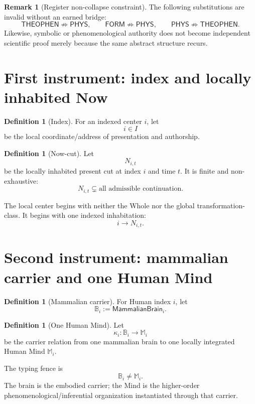 \documentclass[10pt]{article}
\theoremstyle{pe}
\theoremstyle{definition}
\newtheorem{definition}[theorem]{Definition}
\newtheorem{remark}[theorem]{Remark}
\newcommand{\Brain}{\mathsf{MammalianBrain}}
\newcommand{\THEOPHEN}{\mathsf{THEOPHEN}}
\newcommand{\FORM}{\mathsf{FORM}}
\newcommand{\PHYS}{\mathsf{PHYS}}
\begin{document}
\begin{remark}[Register non-collapse constraint]
The following substitutions are invalid without an earned bridge:
\[
\THEOPHEN\not\Rightarrow\PHYS,
\qquad
\FORM\not\Rightarrow\PHYS,
\qquad
\PHYS\not\Rightarrow\THEOPHEN.
\]
Likewise, symbolic or phenomenological authority does not become independent scientific proof merely because the same abstract structure recurs.
\end{remark}

\section{First instrument: index and locally inhabited Now}

\begin{definition}[Index]
For an indexed center \(i\), let
\[
  i\in I
\]
be the local coordinate/address of presentation and authorship.
\end{definition}

\begin{definition}[Now-cut]
Let
\[
  N_{i,t}
\]
be the locally inhabited present cut at index \(i\) and time \(t\).  It is finite and non-exhaustive:
\[
  N_{i,t}\subsetneq \text{all admissible continuation}.
\]
\end{definition}

The local center begins with neither the Whole nor the global transformation-class.  It begins with one indexed inhabitation:
\[
  i\longrightarrow N_{i,t}.
\]

\section{Second instrument: mammalian carrier and one Human Mind}

\begin{definition}[Mammalian carrier]
For Human index \(i\), let
\[
  \mathbb B_i:=\Brain_i.
\]
\end{definition}

\begin{definition}[One Human Mind]
Let
\[
  \kappa_i:\mathbb B_i\longrightarrow \mathbb M_i
\]
be the carrier relation from one mammalian brain to one locally integrated Human Mind \(\mathbb M_i\).
\end{definition}

The typing fence is
\[
  \boxed{\mathbb B_i\neq\mathbb M_i.}
\]
The brain is the embodied carrier; the Mind is the higher-order phenomenological/inferential organization instantiated through that carrier.
\end{document}
